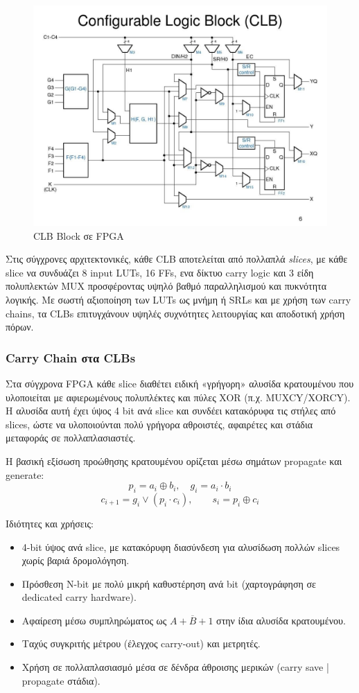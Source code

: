 \begin{figure}[h!]
  \centering
  \includegraphics[width=1.0\textwidth]{figures/chapter3/clb_block.png}
  \caption{CLB Block σε FPGA}
  \label{fig:clb_block}
\end{figure}

Στις σύγχρονες αρχιτεκτονικές, κάθε CLB αποτελείται από πολλαπλά \emph{slices}, με κάθε slice να συνδυάζει 8 input LUTs, 16 FFs, ενα δίκτυο carry logic και 3 είδη πολυπλεκτών MUX
προσφέροντας υψηλό βαθμό παραλληλισμού και πυκνότητα λογικής. Με σωστή αξιοποίηση των LUTs ως μνήμη ή SRLs και με χρήση των carry chains, τα CLBs επιτυγχάνουν υψηλές συχνότητες λειτουργίας και αποδοτική χρήση πόρων.

\subsubsection{Carry Chain στα CLBs}

Στα σύγχρονα FPGA κάθε slice διαθέτει ειδική «γρήγορη» αλυσίδα κρατουμένου που υλοποιείται με αφιερωμένους πολυπλέκτες και πύλες XOR (π.χ. MUXCY/XORCY). Η αλυσίδα αυτή έχει ύψος 4 bit ανά slice και συνδέει κατακόρυφα τις στήλες από slices, ώστε να υλοποιούνται πολύ γρήγορα αθροιστές, αφαιρέτες και στάδια μεταφοράς σε πολλαπλασιαστές.

Η βασική εξίσωση προώθησης κρατουμένου ορίζεται μέσω σημάτων propagate και generate:
\[
p_i = a_i \oplus b_i,\quad g_i = a_i \cdot b_i
\]
\[
c_{i+1} = g_i \lor (p_i \cdot c_i), \qquad s_i = p_i \oplus c_i
\]

Ιδιότητες και χρήσεις:
\begin{itemize}
  \item 4-bit ύψος ανά slice, με κατακόρυφη διασύνδεση για αλυσίδωση πολλών slices χωρίς βαριά δρομολόγηση.
  \item Πρόσθεση N-bit με πολύ μικρή καθυστέρηση ανά bit (χαρτογράφηση σε dedicated carry hardware).
  \item Αφαίρεση μέσω συμπληρώματος ως \(A + \overline{B} + 1\) στην ίδια αλυσίδα κρατουμένου.
  \item Ταχύς συγκριτής μέτρου (έλεγχος carry-out) και μετρητές.
  \item Χρήση σε πολλαπλασιασμό μέσα σε δένδρα άθροισης μερικών (carry save | propagate στάδια).
\end{itemize}

